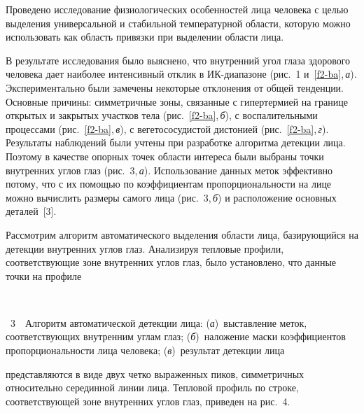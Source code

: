 \begin{multicols}{2}
  Проведено исследование физиологических особенностей лица человека с целью 
выделения универсальной и стабильной температурной области, которую можно 
использовать как область привязки при выделении области лица.



В результате исследования было выяснено, что внутренний угол глаза здорового 
человека дает наиболее интенсивный отклик в ИК-диапазоне (рис.~1 
и~\ref{f2-ba},\,\textit{а}). Экспериментально были замечены некоторые 
отклонения от общей тенденции. Основные причины: симметричные зоны, 
связанные с гипертермией на границе открытых и закрытых участков тела 
(рис.~\ref{f2-ba},\,\textit{б}), с воспалительными процессами 
(рис.~\ref{f2-ba},\,\textit{в}), с вегетососудистой дистонией (рис.~\ref{f2-ba},\,\textit{г}). 
Результаты наблюдений были учтены при разработке алгоритма 
детекции лица. Поэтому в качестве опорных точек области интереса были 
выбраны точки внутренних углов глаз (рис.~3,\,\textit{а}). 
Использование данных меток эффективно потому, что с их помощью по 
коэффициентам про\-пор\-ци\-о\-наль\-ности на лице можно вычислить размеры самого 
лица (рис.~3,\,\textit{б}) и расположение основных деталей~[3].

 

  Рассмотрим алгоритм автоматического выделения области лица, базирующийся 
на детекции внут\-рен\-них углов глаз. Анализируя тепловые профили, 
соответствующие зоне внутренних углов глаз, было установлено, что данные 
точки на профиле\linebreak
 \begin{center} %
\vspace*{1pt}
\mbox{%
\epsfxsize=80.23mm
}
\end{center}
\vspace*{4pt}
{{\figurename~3}\ \ \small{Алгоритм автоматической детекции лица: (\textit{а})~выставление меток, 
соответствующих внутренним углам глаз; (\textit{б})~наложение маски коэффициентов 
пропорциональности лица человека; (\textit{в})~результат детекции лица}}

\bigskip
\addtocounter{figure}{1}

\noindent
 пред\-став\-ля\-ют\-ся в виде двух четко выраженных пиков, 
симметричных относительно серединной линии лица. Тепловой профиль по 
строке, соответствующей зоне внутренних углов глаз, приведен на рис.~4. 





\end{multicols}
